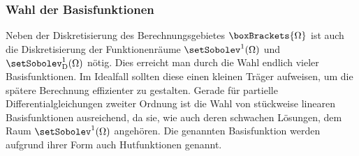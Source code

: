 \documentclass[crop=false]{standalone}
\begin{document}
      \subsubsection{Wahl der Basisfunktionen}
        Neben der Diskretisierung des Berechnungsgebietes $\boxBrackets{\domain}$ ist auch die Diskretisierung der Funktionenräume $\setSobolev^1(\domain)$ und $\setSobolev^1_\mathrm{D}(\domain)$ nötig.
        Dies erreicht man durch die Wahl endlich vieler Basisfunktionen.
        Im Idealfall sollten diese einen kleinen Träger aufweisen, um die spätere Berechnung effizienter zu gestalten.
        Gerade für partielle Differentialgleichungen zweiter Ordnung ist die Wahl von stückweise linearen Basisfunktionen ausreichend, da sie, wie auch deren schwachen Lösungen, dem Raum $\setSobolev^1(\Omega)$ angehören.
        Die genannten Basisfunktion werden aufgrund ihrer Form auch Hutfunktionen genannt.
        \cite{Schweizer2013,Alberty1998,Logan2007,Cheney2008,Quarteroni2000}
\end{document}
